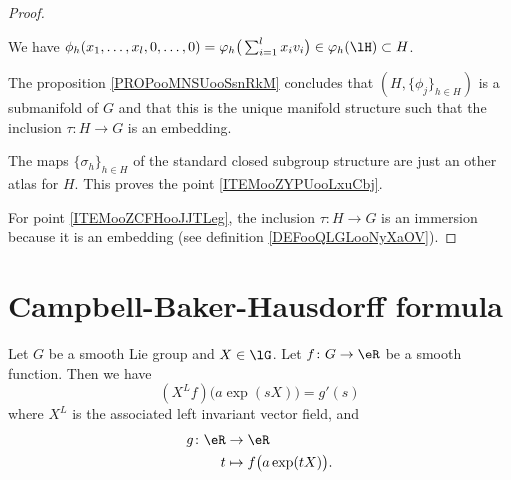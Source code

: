 \begin{theorem}
\begin{proof}
\begin{subproof}
		We have \( \phi_h(x_1,\ldots,x_l,0,\ldots,0)=\varphi_h\big( \sum_{i=1}^lx_iv_i \big)\in\varphi_h(\lH)\subset H\).
	\end{subproof}
	The proposition \ref{PROPooMNSUooSsnRkM} concludes that \( (H,\{ \phi_j \}_{h\in H})\) is a submanifold of \( G\) and that this is the unique manifold structure such that the inclusion \(\tau \colon H\to G  \) is an embedding.

	The maps \( \{ \sigma_h \}_{h\in H}\) of the standard closed subgroup structure are just an other atlas for \( H\). This proves the point \ref{ITEMooZYPUooLxuCbj}.

	For point \ref{ITEMooZCFHooJJTLeg}, the inclusion \(\tau \colon H\to G  \) is an immersion because it is an embedding (see definition \ref{DEFooQLGLooNyXaOV}).
\end{proof}


\section{Campbell-Baker-Hausdorff formula}


\begin{proposition}	\label{PROPooNEIHooWQctei}
	Let \( G\) be a smooth Lie group and \( X\in\lG\). Let \(f \colon G\to \eR  \) be a smooth function. Then we have
	\begin{equation}
		(X^Lf)\big( a\exp(sX) \big)=g'(s)
	\end{equation}
	where \( X^L\) is the associated left invariant vector field, and
	\begin{equation}
		\begin{aligned}
			g\colon \eR & \to \eR                         \\
			t           & \mapsto f\big( a\exp(tX) \big).
		\end{aligned}
	\end{equation}
\end{proposition}


\end{theorem}
